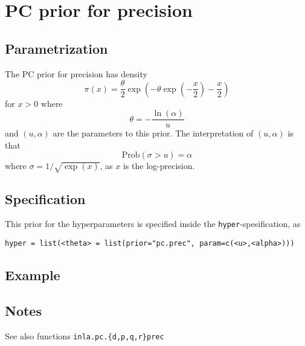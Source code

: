 \documentclass[a4paper,11pt]{article}
\begin{document}
\section*{PC prior for precision}

\subsection*{Parametrization}
The PC prior for precision has density 
\begin{equation}
    \pi(x) = \frac{\theta}{2} \exp\left(
      -\theta\exp\left(-\frac{x}{2}\right) - \frac{x}{2}
    \right)
\end{equation}
for $x>0$ where
\begin{displaymath}
    \theta = -\frac{\ln(\alpha)}{u}
\end{displaymath}
and $(u, \alpha{})$ are the parameters to this prior. The
interpretation of $(u,\alpha)$ is that
\begin{displaymath}
    \text{Prob}(\sigma > u) = \alpha
\end{displaymath}
where $\sigma = 1/\sqrt{\exp(x)}$, as $x$ is the log-precision.

\subsection*{Specification}
This prior for the hyperparameters is specified inside the
\texttt{hyper}-spesification, as
\begin{center}
    \texttt{hyper = list(<theta> =
        list(prior="pc.prec", param=c(<u>,<alpha>)))}
\end{center}

\subsection*{Example}

\subsection*{Notes}

See also functions \texttt{inla.pc.\{d,p,q,r\}prec}
\end{document}
